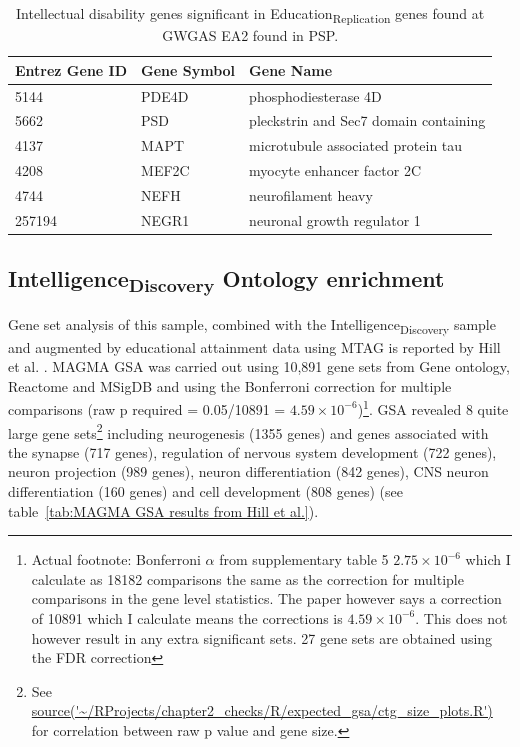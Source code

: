 \begin{table}[ht]
\centering
\begin{tabular}{lll}
  \hline
Entrez Gene ID & Gene Symbol & Gene Name \\
  \hline
5144 & PDE4D & phosphodiesterase 4D  \\
  5662 & PSD & pleckstrin and Sec7 domain containing \\
  
  4137 & MAPT & microtubule associated protein tau \\ 
  4208 & MEF2C & myocyte enhancer factor 2C \\ 
  4744 & NEFH & neurofilament heavy \\
  257194 & NEGR1 & neuronal growth regulator 1 \\ 
   \hline
\end{tabular}
\caption{Intellectual disability genes significant in Education\textsubscript{Replication} genes found at GWGAS EA2 found in PSP.} 
\label{tab:Intellectual disability genes significant in EA2 found in PSP}
\end{table}
 
        
\subsection{Intelligence\textsubscript{Discovery} Ontology enrichment}


Gene set analysis of this sample, combined with the Intelligence\textsubscript{Discovery} sample and augmented by educational attainment data using MTAG is reported by Hill et al.  \cite{hill2019combined}. MAGMA GSA was carried out using 10,891 gene sets from Gene ontology, Reactome and MSigDB and using the Bonferroni correction for multiple comparisons (raw p required = 0.05/10891 = $4.59 \times 10^{-6}$)\footnote{Actual footnote: Bonferroni $\alpha$ from supplementary table 5 $2.75\times10^{-6}$
 which I calculate as 18182 comparisons the same as the correction for multiple comparisons in the gene level statistics. The paper however says a correction of 10891 which I calculate means the corrections is $4.59\times10^{-6}$. This does not however result in any extra significant sets.  27 gene sets are obtained using the FDR correction }. GSA revealed 8 quite large gene sets\footnote{See \url{source('~/RProjects/chapter2_checks/R/expected_gsa/ctg_size_plots.R')} for correlation between raw p value and gene size.} including neurogenesis (1355 genes) and genes associated with the synapse (717 genes), regulation of nervous system development (722 genes), neuron projection (989 genes), neuron differentiation (842 genes), CNS neuron differentiation (160 genes) and cell development (808 genes) (see table~\ref{tab:MAGMA GSA results from Hill et al.}). 


